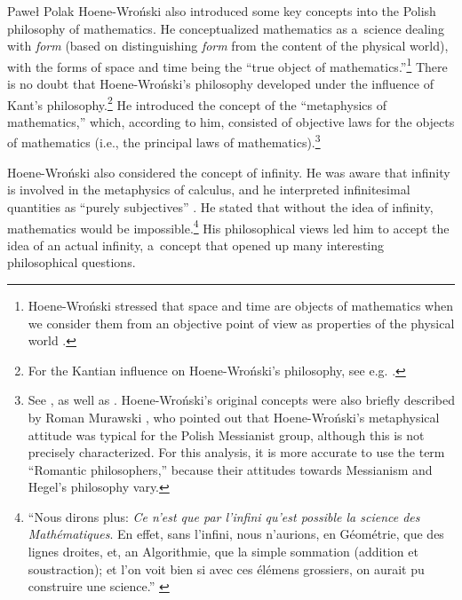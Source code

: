 \begin{artengenv}{Paweł Polak}
Hoene-Wroński also introduced some key concepts into the Polish philosophy of mathematics. He conceptualized mathematics as a~science dealing with \textit{form} (based on distinguishing \textit{form} from the content of the physical world), with the forms of space and time being the ``true object of mathematics.''\footnote{Hoene-Wroński stressed that space and time are objects of mathematics when we consider them from an objective point of view as properties of the physical world
\parencite[see the footnote in][p.2]{hoene-wronski_introduction_1811}.%
} There is no doubt that Hoene-Wroński's philosophy developed under the influence of Kant's philosophy.\footnote{For the Kantian influence on Hoene-Wroński's philosophy, see e.g. 
\parencites[][]{wagner_wronskis_2014}[][chap.3]{wagner_wronskis_2016}.%
} He introduced the concept of the ``metaphysics of mathematics,'' which, according to him, consisted of objective laws for the objects of mathematics (i.e., the principal laws of mathematics).\footnote{See 
\parencite[][]{wagner_wronskis_2016}, %
 as well as 
\parencite[][]{pragacz_notes_2007}. %
 Hoene-Wroński's original concepts were also briefly described by Roman Murawski 
\parencite*[][pp.5–7]{murawski_philosophy_2014}, %
 who pointed out that Hoene-Wroński's metaphysical attitude was typical for the Polish Messianist group, although this is not precisely characterized. For this analysis, it is more accurate to use the term ``Romantic philosophers,'' because their attitudes towards Messianism and Hegel's philosophy vary.}

Hoene-Wroński also considered the concept of infinity. He was aware that infinity is involved in the metaphysics of calculus, and he interpreted infinitesimal quantities as ``purely subjectives''
\parencite[][p.35nn]{hoene-wronski_philosophie_1814}. %
 He stated that without the idea of infinity, mathematics would be impossible.\footnote{``Nous dirons plus: \textit{Ce n'est que par l'infini qu'est possible la science des Mathématiques}. En effet, sans l'infini, nous n'aurions, en Géométrie, que des lignes droites, et, an Algorithmie, que la simple sommation (addition et soustraction); et l'on voit bien si avec ces élémens grossiers, on aurait pu construire une science.'' 
\parencite[][pp.43–44]{hoene-wronski_philosophie_1814}} %
 His philosophical views led him to accept the idea of an actual infinity, a~concept that opened up many interesting philosophical questions.


\end{artengenv}
